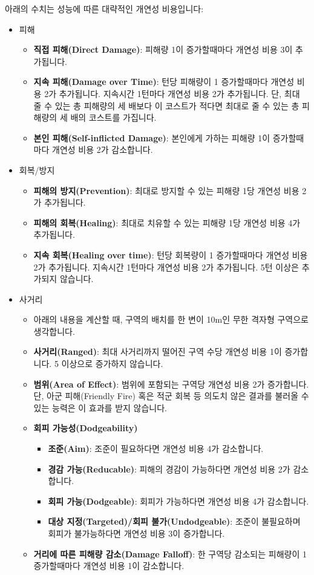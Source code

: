 \documentclass{report}
\begin{document}
	아래의 수치는 성능에 따른 대략적인 개연성 비용입니다:
	\begin{itemize}
		\item 피해
		\begin{itemize}
			\item \textbf{직접 피해(Direct Damage)}: 피해량 1이 증가할때마다 개연성 비용 3이 추가됩니다.
			\item \textbf{지속 피해(Damage over Time)}: 턴당 피해량이 1 증가할때마다 개연성 비용 2가 추가됩니다. 지속시간 1턴마다 개연성 비용 2가 추가됩니다. 단, 최대 줄 수 있는 총 피해량의 세 배보다 이 코스트가 적다면 최대로 줄 수 있는 총 피해량의 세 배의 코스트를 가집니다.
			\item \textbf{본인 피해(Self-inflicted Damage)}: 본인에게 가하는 피해량 1이 증가할때마다 개연성 비용 2가 감소합니다.
		\end{itemize}
		
		\item 회복/방지
		\begin{itemize}
			\item \textbf{피해의 방지(Prevention)}: 최대로 방지할 수 있는 피해량 1당 개연성 비용 2가 추가됩니다.
			\item \textbf{피해의 회복(Healing)}: 최대로 치유할 수 있는 피해량 1당 개연성 비용 4가 추가됩니다.
			\item \textbf{지속 회복(Healing over time)}: 턴당 회복량이 1 증가할때마다 개연성 비용 2가 추가됩니다. 지속시간 1턴마다 개연성 비용 2가 추가됩니다. 5턴 이상은 추가되지 않습니다.
		\end{itemize}
		
		\item 사거리
		\begin{itemize}
			\item 아래의 내용을 계산할 때, 구역의 배치를 한 변이 10m인 무한 격자형 구역으로 생각합니다.
			\item \textbf{사거리(Ranged)}: 최대 사거리까지 떨어진 구역 수당 개연성 비용 1이 증가합니다. 5 이상으로 증가하지 않습니다.
			\item \textbf{범위(Area of Effect)}: 범위에 포함되는 구역당 개연성 비용 2가 증가합니다. 단, 아군 피해(Friendly Fire) 혹은 적군 회복 등 의도치 않은 결과를 불러올 수 있는 능력은 이 효과를 받지 않습니다.
			\item \textbf{회피 가능성(Dodgeability)}
				\begin{itemize}
					\item \textbf{조준(Aim)}: 조준이 필요하다면 개연성 비용 4가 감소합니다.
					\item \textbf{경감 가능(Reducable)}: 피해의 경감이 가능하다면 개연성 비용 2가 감소합니다.
					\item \textbf{회피 가능(Dodgeable)}: 회피가 가능하다면 개연성 비용 4가 감소합니다.
					\item \textbf{대상 지정(Targeted)/회피 불가(Undodgeable)}: 조준이 불필요하며 회피가 불가능하다면 개연성 비용 3이 증가합니다.
				\end{itemize}
			\item \textbf{거리에 따른 피해량 감소(Damage Falloff)}: 한 구역당 감소되는 피해량이 1 증가할때마다 개연성 비용 1이 감소합니다.
		\end{itemize}
		

\end{itemize}
\end{document}
